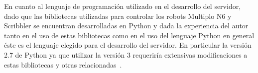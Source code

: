 En cuanto al lenguaje de programación utilizado en el desarrollo del servidor,
dado que las bibliotecas utilizadas para controlar los robots Multiplo N6 y
Scribbler se encuentran desarrolladas en Python y dada la experiencia del autor
tanto en el uso de estas bibliotecas como en el uso del lenguaje Python en general
éste es el lenguaje elegido para el desarrollo del servidor. En particular la
versión 2.7 de Python ya que utilizar la versión 3 requeriría extensivas
modificaciones a estas bibliotecas y otras relacionadas~\cite{lutz_2014}.
